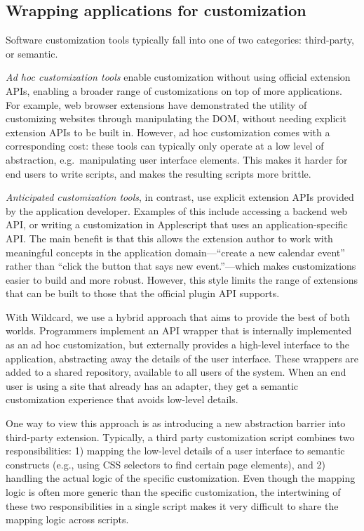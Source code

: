\documentclass[sigplan,10pt,anonymous,review]{acmart}
\begin{document}
\hypertarget{wrapping-applications-for-customization}{%
\subsection{Wrapping applications for
customization}\label{wrapping-applications-for-customization}}

Software customization tools typically fall into one of two categories:
third-party, or semantic.

\emph{Ad hoc customization tools} enable customization without using
official extension APIs, enabling a broader range of customizations on
top of more applications. For example, web browser extensions have
demonstrated the utility of customizing websites through manipulating
the DOM, without needing explicit extension APIs to be built in.
However, ad hoc customization comes with a corresponding cost: these
tools can typically only operate at a low level of abstraction,
e.g.~manipulating user interface elements. This makes it harder for end
users to write scripts, and makes the resulting scripts more brittle.

\emph{Anticipated customization tools}, in contrast, use explicit
extension APIs provided by the application developer. Examples of this
include accessing a backend web API, or writing a customization in
Applescript that uses an application-specific API. The main benefit is
that this allows the extension author to work with meaningful concepts
in the application domain---``create a new calendar event'' rather than
``click the button that says new event.''---which makes customizations
easier to build and more robust. However, this style limits the range of
extensions that can be built to those that the official plugin API
supports.

With Wildcard, we use a hybrid approach that aims to provide the best of
both worlds. Programmers implement an API wrapper that is internally
implemented as an ad hoc customization, but externally provides a
high-level interface to the application, abstracting away the details of
the user interface. These wrappers are added to a shared repository,
available to all users of the system. When an end user is using a site
that already has an adapter, they get a semantic customization
experience that avoids low-level details.

One way to view this approach is as introducing a new abstraction
barrier into third-party extension. Typically, a third party
customization script combines two responsibilities: 1) mapping the
low-level details of a user interface to semantic constructs (e.g.,
using CSS selectors to find certain page elements), and 2) handling the
actual logic of the specific customization. Even though the mapping
logic is often more generic than the specific customization, the
intertwining of these two responsibilities in a single script makes it
very difficult to share the mapping logic across scripts.
\end{document}
